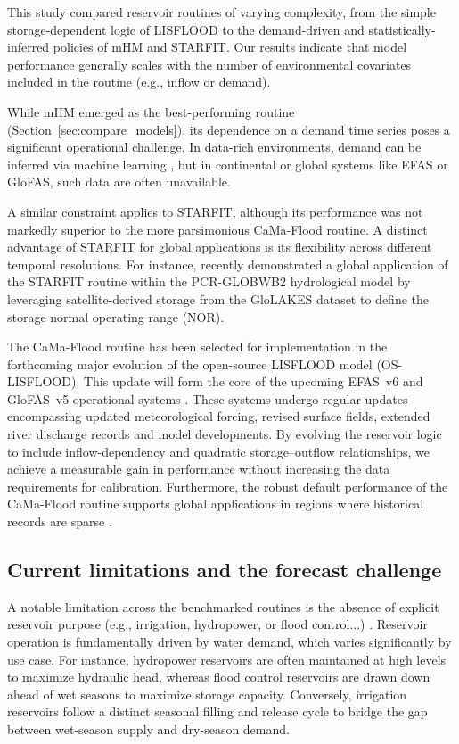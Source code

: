 \documentclass[hess, manuscript]{copernicus}
\begin{document}
This study compared reservoir routines of varying complexity, from the simple storage-dependent logic of LISFLOOD to the demand-driven and statistically-inferred policies of mHM and STARFIT. Our results indicate that model performance generally scales with the number of environmental covariates included in the routine (e.g., inflow or demand).

While mHM emerged as the best-performing routine (Section~\ref{sec:compare_models}), its dependence on a demand time series poses a significant operational challenge. In data-rich environments, demand can be inferred via machine learning \citep{Shrestha2024}, but in continental or global systems like EFAS or GloFAS, such data are often unavailable. 

A similar constraint applies to STARFIT, although its performance was not markedly superior to the more parsimonious CaMa-Flood routine. A distinct advantage of STARFIT for global applications is its flexibility across different temporal resolutions. For instance, \citet{Steyaert2025} recently demonstrated a global application of the STARFIT routine within the PCR-GLOBWB2 hydrological model by leveraging satellite-derived storage from the GloLAKES dataset \citep{Hou2024} to define the storage normal operating range (NOR).

The CaMa-Flood routine has been selected for implementation in the forthcoming major evolution of the open-source LISFLOOD model (OS-LISFLOOD). This update will form the core of the upcoming EFAS~v6 and GloFAS~v5 operational systems \citep{Salamon2025}. These systems undergo regular updates encompassing updated meteorological forcing, revised surface fields, extended river discharge records and model developments. By evolving the reservoir logic to include inflow-dependency and quadratic storage--outflow relationships, we achieve a measurable gain in performance without increasing the data requirements for calibration. Furthermore, the robust default performance of the CaMa-Flood routine supports global applications in regions where historical records are sparse \citep{Hanazaki2022}.

\subsection{Current limitations and the forecast challenge}
\label{sec:limitations}

A notable limitation across the benchmarked routines is the absence of explicit reservoir purpose (e.g., irrigation, hydropower, or flood control...) \citep{Shen2025}. Reservoir operation is fundamentally driven by water demand, which varies significantly by use case. For instance, hydropower reservoirs are often maintained at high levels to maximize hydraulic head, whereas flood control reservoirs are drawn down ahead of wet seasons to maximize storage capacity. Conversely, irrigation reservoirs follow a distinct seasonal filling and release cycle to bridge the gap between wet-season supply and dry-season demand. 
\end{document}
